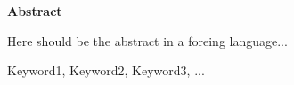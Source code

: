 \documentclass[spanish,a4paper,14pt,oneside]{extreport}
\newenvironment{summary}
  {\par\noindent\begin{center}\textbf{Abstract}\end{center}\begin{itshape}\par\noindent}
  {\end{itshape}}
\newenvironment{keywords}
  {\begin{list}{}{\setlength{\leftmargin}{1em}}\item[\hskip\labelsep \bfseries Keywords:]}
  {\end{list}}
\begin{document}
  \newpage  %
  \begin{summary}
  {\em
   
  Here should be the abstract in a foreing language...
   
  }
   
  \begin{keywords}
  Keyword1, Keyword2, Keyword3, ...
  \end{keywords}
   
  \end{summary}
   
  \newpage{\pagestyle{empty}}
  \thispagestyle{empty}
   
   
   
  \pagestyle{myheadings} %
   
  \renewcommand{\thepage}{\roman{page}}
  \setcounter{page}{1}
   
   
  \tableofcontents
   
  \newpage{\pagestyle{empty}}
   
  \listoffigures
   
  \newpage{\pagestyle{empty}}
   
  \listoftables
   
  \newpage{\pagestyle{empty}}
   
  \renewcommand{\thepage}{\arabic{page}}
  \setcounter{page}{1}
   
\end{document}
